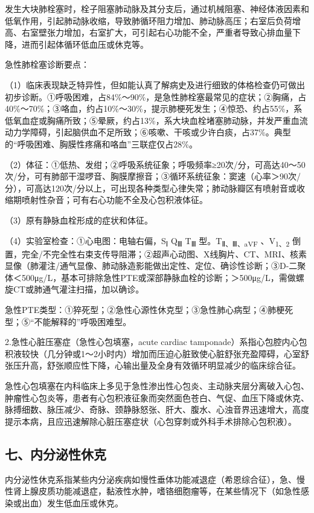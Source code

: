 发生大块肺栓塞时，栓子阻塞肺动脉及其分支后，通过机械阻塞、神经体液因素和低氧作用，引起肺动脉收缩，导致肺循环阻力增加、肺动脉高压；右室后负荷增高、右室壁张力增加，右室扩大，可引起右心功能不全，严重者导致心排血量下降，进而引起体循环低血压或休克等。

急性肺栓塞诊断要点：

（1）临床表现缺乏特异性，但如能认真了解病史及进行细致的体格检查仍可做出初步诊断。①呼吸困难，占84\%～90\%，是急性肺栓塞最常见的症状；②胸痛，占40\%～70\%；③咯血，约占10\%～30\%，提示肺梗死发生；④惊恐、约占55\%，系低氧血症或胸痛所致；⑤晕厥，约占13\%，系大块血栓堵塞肺动脉，并发严重血流动力学障碍，引起脑供血不足所致；⑥咳嗽、干咳或少许白痰，占37\%。典型的“呼吸困难、胸膜性疼痛和咯血”三联症仅占28\%。

（2）体征：①低热、发绀；②呼吸系统征象；呼吸频率≥20次/分，可高达40～50次/分，可有肺部干湿啰音、胸膜摩擦音；③循环系统征象：窦速（心率＞90次/分），可高达120次/分以上，可出现各种类型心律失常；肺动脉瓣区有喷射音或收缩期喷射性杂音；可有右心功能不全及心包积液体征。

（3）原有静脉血栓形成的症状和体征。

（4）实验室检查：①心电图：电轴右偏，S\textsubscript{Ⅰ}
Q\textsubscript{Ⅲ} T\textsubscript{Ⅲ} 型。T\textsubscript{Ⅱ、Ⅲ、aVF}
、V\textsubscript{1、2}
倒置，完全/不完全性右束支传导阻滞；②超声心动图、X线胸片、CT、MRI、核素显像（肺灌注/通气显像、肺动脉造影能做出定性、定位、确诊性诊断；③D-二聚体＜500μg/L，基本可排除急性PTE或深部静脉血栓的诊断；＞500μg/L，需做螺旋CT或肺通气灌注扫描，加以确诊。

急性PTE类型：①猝死型；②急性心源性休克型；③急性肺心病型；④肺梗死型；⑤“不能解释的”呼吸困难型。

2.急性心脏压塞症（急性心包填塞，acute cardiac
tamponade）系指心包腔内心包积液较快（几分钟或1～2小时内）增加而压迫心脏致使心脏舒张充盈障碍，心室舒张压升高，舒张顺应性下降，心输出量及全身有效循环明显减少的临床综合征。

急性心包填塞在内科临床上多见于急性渗出性心包炎、主动脉夹层分离破入心包、肿瘤性心包炎等，患者有心包积液征象而突然面色苍白、气促、血压下降或休克、脉搏细数、脉压减少、奇脉、颈静脉怒张、肝大、腹水、心浊音界迅速增大，高度提示本病，且应迅速解除心脏压塞症状（心包穿刺或外科手术排除心包积液）。

\subsection{七、内分泌性休克}

内分泌性休克系指某些内分泌疾病如慢性垂体功能减退症（希恩综合征），急、慢性肾上腺皮质功能减退症，黏液性水肿，嗜铬细胞瘤等，在某些情况下（如急性感染或出血）发生低血压或休克。

